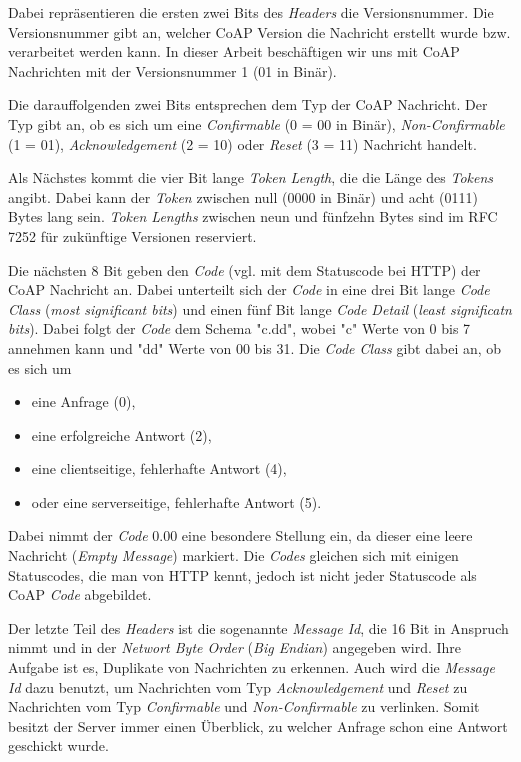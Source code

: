 Dabei repräsentieren die ersten zwei Bits des \textit{Headers} die Versionsnummer. Die Versionsnummer gibt an, welcher CoAP Version die Nachricht erstellt wurde bzw. verarbeitet werden kann. In dieser Arbeit beschäftigen wir uns mit CoAP Nachrichten mit der Versionsnummer 1 (01 in Binär).

Die darauffolgenden zwei Bits entsprechen dem Typ der CoAP Nachricht. Der Typ gibt an, ob es sich um eine \textit{Confirmable} (0 = 00 in Binär), \textit{Non-Confirmable} (1 = 01), \textit{Acknowledgement}  (2 = 10) oder \textit{Reset} (3 = 11) Nachricht handelt.

Als Nächstes kommt die vier Bit lange \textit{Token Length}, die die Länge des \textit{Tokens} angibt. Dabei kann der \textit{Token} zwischen null (0000 in Binär) und acht (0111) Bytes lang sein. \textit{Token Lengths} zwischen neun und fünfzehn Bytes sind im RFC 7252 \autocite{RFC7252} für zukünftige Versionen reserviert.

Die nächsten 8 Bit geben den \textit{Code} (vgl. mit dem Statuscode bei HTTP) der CoAP Nachricht an. Dabei unterteilt sich der \textit{Code} in eine drei Bit lange \textit{Code Class} (\textit{most significant bits}) und einen fünf Bit lange \textit{Code Detail} (\textit{least significatn bits}). Dabei folgt der \textit{Code} dem Schema "c.dd", wobei "c" Werte von 0 bis 7 annehmen kann und "dd" Werte von 00 bis 31. Die \textit{Code Class} gibt dabei an, ob es sich um
\begin{itemize}
    \item eine Anfrage (0),
    \item eine erfolgreiche Antwort (2),
    \item eine clientseitige, fehlerhafte Antwort (4),
    \item oder eine serverseitige, fehlerhafte Antwort (5).
\end{itemize}

Dabei nimmt der \textit{Code} 0.00 eine besondere Stellung ein, da dieser eine leere Nachricht (\textit{Empty Message}) markiert. Die \textit{Codes} gleichen sich mit einigen Statuscodes, die man von HTTP kennt, jedoch ist nicht jeder Statuscode als CoAP \textit{Code} abgebildet.

Der letzte Teil des \textit{Headers} ist die sogenannte \textit{Message Id}, die 16 Bit in Anspruch nimmt und in der \textit{Networt Byte Order} (\textit{Big Endian}) angegeben wird. Ihre Aufgabe ist es, Duplikate von Nachrichten zu erkennen. Auch wird die \textit{Message Id} dazu benutzt, um Nachrichten vom Typ \textit{Acknowledgement} und \textit{Reset} zu Nachrichten vom Typ \textit{Confirmable} und \textit{Non-Confirmable} zu verlinken. Somit besitzt der Server immer einen Überblick, zu welcher Anfrage schon eine Antwort geschickt wurde.

